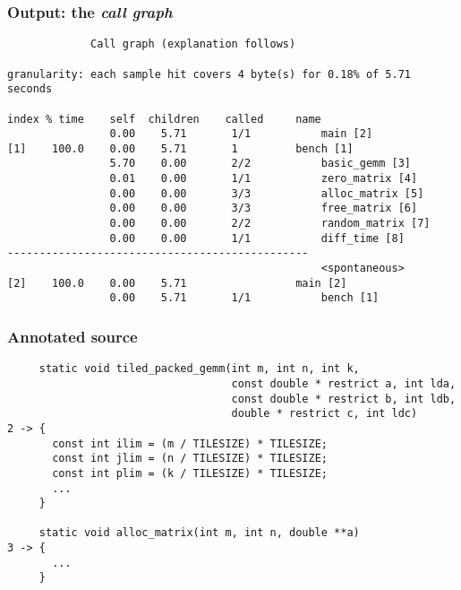 \documentclass[dvipsnames,presentation,aspectratio=169,14pt]{beamer}
\begin{document}
\begin{frame}[fragile]
  \frametitle{Output: the \emph{call graph}}
\begin{verbatim}
		     Call graph (explanation follows)

granularity: each sample hit covers 4 byte(s) for 0.18% of 5.71 seconds

index % time    self  children    called     name
                0.00    5.71       1/1           main [2]
[1]    100.0    0.00    5.71       1         bench [1]
                5.70    0.00       2/2           basic_gemm [3]
                0.01    0.00       1/1           zero_matrix [4]
                0.00    0.00       3/3           alloc_matrix [5]
                0.00    0.00       3/3           free_matrix [6]
                0.00    0.00       2/2           random_matrix [7]
                0.00    0.00       1/1           diff_time [8]
-----------------------------------------------
                                                 <spontaneous>
[2]    100.0    0.00    5.71                 main [2]
                0.00    5.71       1/1           bench [1]
\end{verbatim}
\end{frame}

\begin{frame}[fragile]
  \frametitle{Annotated source}
\begin{verbatim}
     static void tiled_packed_gemm(int m, int n, int k,
                                   const double * restrict a, int lda,
                                   const double * restrict b, int ldb,
                                   double * restrict c, int ldc)
2 -> {
       const int ilim = (m / TILESIZE) * TILESIZE;
       const int jlim = (n / TILESIZE) * TILESIZE;
       const int plim = (k / TILESIZE) * TILESIZE;
       ...
     }

     static void alloc_matrix(int m, int n, double **a)
3 -> {
       ...
     }
\end{verbatim}
\end{frame}
\end{document}
